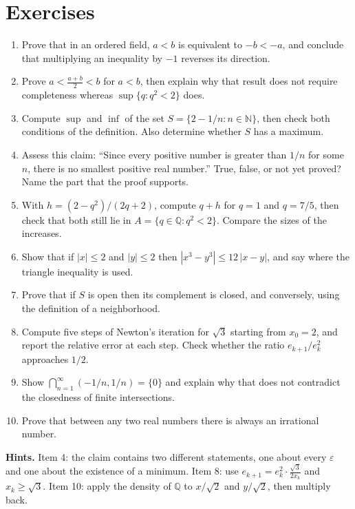 \section{Exercises}

\begin{latihan}
\begin{enumerate}
  \item Prove that in an ordered field, $a<b$ is equivalent to $-b<-a$, and conclude
        that multiplying an inequality by $-1$ reverses its direction.
  \item Prove $a<\frac{a+b}{2}<b$ for $a<b$, then explain why that result does not
        require completeness whereas $\sup\{q:q^2<2\}$ does.
  \item Compute $\sup$ and $\inf$ of the set $S=\{2-1/n : n\in\mathbb{N}\}$, then check
        both conditions of the definition. Also determine whether $S$ has a maximum.
  \item Assess this claim: ``Since every positive number is greater than $1/n$ for some
        $n$, there is no smallest positive real number.'' True, false, or not yet
        proved? Name the part that the proof supports.
  \item With $h=(2-q^2)/(2q+2)$, compute $q+h$ for $q=1$ and $q=7/5$, then check that
        both still lie in $A=\{q\in\mathbb{Q}:q^2<2\}$. Compare the sizes of the
        increases.
  \item Show that if $|x|\le 2$ and $|y|\le 2$ then
        $|x^3-y^3|\le 12\,|x-y|$, and say where the triangle inequality is used.
  \item Prove that if $S$ is open then its complement is closed, and conversely, using
        the definition of a neighborhood.
  \item Compute five steps of Newton's iteration for $\sqrt{3}$ starting from $x_0=2$,
        and report the relative error at each step. Check whether the ratio
        $e_{k+1}/e_k^2$ approaches $1/2$.
  \item Show $\bigcap_{n=1}^{\infty}(-1/n,1/n)=\{0\}$ and explain why that does not
        contradict the closedness of finite intersections.
  \item Prove that between any two real numbers there is always an irrational number.
\end{enumerate}

\noindent\textbf{Hints.} Item 4: the claim contains two different statements, one about
every $\varepsilon$ and one about the existence of a minimum. Item 8: use
$e_{k+1}=e_k^2\cdot\frac{\sqrt3}{2x_k}$ and $x_k\ge\sqrt3$. Item 10: apply the density
of $\mathbb{Q}$ to $x/\sqrt2$ and $y/\sqrt2$, then multiply back.
\end{latihan}

